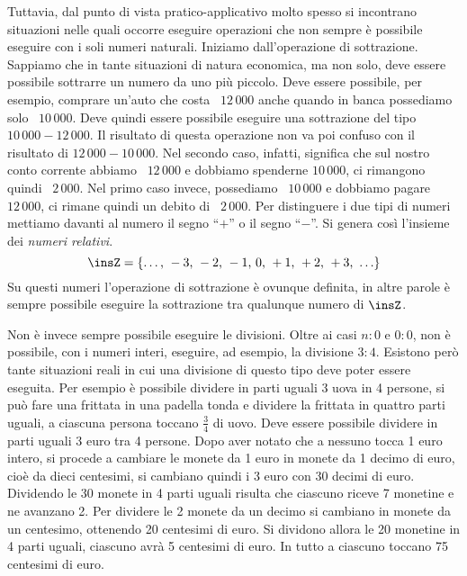 Tuttavia, dal punto di vista pratico-applicativo molto spesso si incontrano situazioni nelle quali occorre eseguire operazioni che non sempre è possibile eseguire con i soli numeri naturali. Iniziamo dall'operazione di sottrazione. Sappiamo che in tante situazioni di natura economica, ma non solo, deve essere possibile sottrarre un numero da uno più piccolo. Deve essere possibile, per esempio, comprare un'auto che costa \officialeuro~$12\,000$ anche quando in banca possediamo solo \officialeuro~$10\,000$. Deve quindi essere possibile eseguire una sottrazione del tipo $10\,000-12\,000$. Il risultato di questa operazione non va poi confuso con il risultato di $12\,000-10\,000$. Nel secondo caso, infatti, significa che sul nostro conto corrente abbiamo \officialeuro~$12\,000$ e dobbiamo spenderne $10\,000$, ci rimangono quindi \officialeuro~$2\,000$. Nel primo caso invece, possediamo \officialeuro~$10\,000$ e dobbiamo pagare
\officialeuro~$12\,000$, ci rimane quindi un debito di \officialeuro~$2\,000$. Per distinguere i due tipi di numeri mettiamo davanti al numero il segno ``$+$'' o il segno ``$-$''. Si genera così l'insieme dei \emph{numeri relativi}.
\[\insZ=\{\ldots\text{, }-3\text{, }-2\text{, }-1\text{, }0\text{, }+1\text{, }+2\text{, }+3\text{, }\ldots\}\]
Su questi numeri l'operazione di sottrazione è ovunque definita, in altre parole è sempre possibile eseguire la sottrazione tra qualunque numero di $\insZ$.

Non è invece sempre possibile eseguire le divisioni. Oltre ai casi $n:0$ e $0:0$, non è possibile, con i numeri interi, eseguire, ad esempio, la divisione $3:4$. Esistono però tante situazioni reali in cui una divisione di questo tipo deve poter essere eseguita. Per esempio è possibile dividere in parti uguali 3 uova in 4 persone, si può fare una frittata in una padella tonda e dividere la frittata in quattro parti uguali, a ciascuna persona toccano $\frac{3}{4}$ di uovo. Deve
essere possibile dividere in parti uguali 3 euro tra 4 persone. Dopo aver notato che a nessuno tocca 1 euro intero, si procede a cambiare le monete da 1 euro in monete da 1 decimo di euro, cioè da dieci centesimi, si cambiano quindi i 3 euro con 30 decimi di euro. Dividendo le 30 monete in 4 parti uguali risulta che ciascuno riceve 7 monetine e ne avanzano 2. Per dividere le 2 monete da un decimo si cambiano in monete da un centesimo, ottenendo 20 centesimi di euro. Si dividono allora le 20 monetine in 4 parti uguali, ciascuno avrà 5 centesimi di euro. In tutto a ciascuno toccano 75 centesimi di euro.

